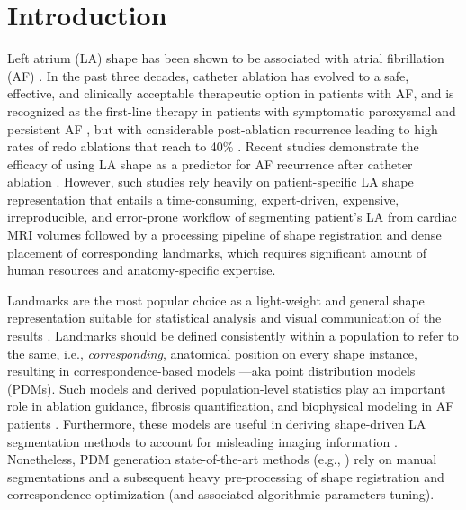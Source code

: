\documentclass[twocolumn]{cinc}
\begin{document}
\section{Introduction}
\vspace{-0.1in}
Left atrium (LA) shape has been shown to be associated with atrial fibrillation (AF) \cite{marrouche2014decaaf, bisbal2013sphericity}. In the past three decades, catheter ablation has evolved to a safe, effective, and clinically acceptable therapeutic option in patients with AF, and is recognized as the first-line therapy in patients with symptomatic paroxysmal and persistent AF \cite{calkins20172017}, but with considerable post-ablation recurrence leading to high rates of redo ablations that reach to 40\% \cite{calkins20172017, darby2016recurrent}.
Recent studies demonstrate the efficacy of using LA shape as a predictor for AF recurrence after catheter ablation \cite{bieging2018left,cates2014computational,cates2013afib}.
However, such studies rely heavily on patient-specific LA shape representation that entails a time-consuming, expert-driven, expensive, irreproducible, and error-prone workflow of segmenting patient's LA from cardiac MRI volumes followed by a processing pipeline of shape registration and dense placement of corresponding landmarks, which requires significant amount of human resources and anatomy-specific expertise. 

Landmarks are the most popular choice as a light-weight and general shape representation suitable for statistical analysis and visual communication of the results \cite{sarkalkan2014statistical}. Landmarks should be defined consistently within a population to refer to the same, i.e., \textit{corresponding}, anatomical position on every shape instance,  resulting in correspondence-based models ---aka point distribution models (PDMs). Such models and derived population-level statistics play an important role in ablation guidance, fibrosis quantification, and biophysical modeling in AF patients \cite{calkins20172017,marrouche2014decaaf,krueger2013silico}. Furthermore, these models are useful in deriving shape-driven LA segmentation methods to account for misleading imaging information \cite{tobon2015benchmark}. Nonetheless, PDM generation state-of-the-art methods (e.g., \cite{cates2017shapeworks,durrleman2014morphometry,styner2006spharm}) rely on manual segmentations and a subsequent heavy pre-processing of shape registration and correspondence optimization (and associated algorithmic parameters tuning).
\end{document}
